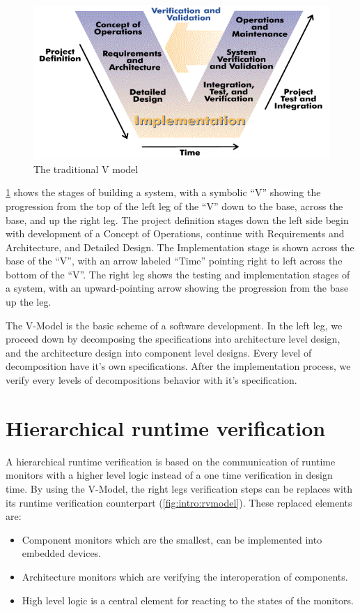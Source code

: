 \begin{figure}[h]
	\centering
	\includegraphics[width=0.8\linewidth]{include/figures/chapter_1/VModel}
	\caption{The traditional V model \cite{vmodel}}
	\label{fig:intro:vmodel}
\end{figure}

\cref{fig:intro:vmodel} shows the stages of building a system, with a symbolic “V” showing the progression from the top of the left leg of the ``V'' down to the base, across the base, and up the right leg. The project definition stages down the left side begin with development of a Concept of Operations, continue with Requirements and Architecture, and Detailed Design. The Implementation stage is shown across the base of the ``V'', with an arrow labeled ``Time'' pointing right to left across the bottom of the ``V''. The right leg shows the testing and implementation stages of a system, with an upward-pointing arrow showing the progression from the base up the leg. \cite{vmodel}

The V-Model is the basic scheme of a software development. In the left leg, we proceed down by decomposing the specifications into architecture level design, and the architecture design into component level designs. Every level of decomposition have it's own specifications. After the implementation process, we verify every levels of decompositions behavior with it's specification.

\section{Hierarchical runtime verification}

A hierarchical runtime verification is based on the communication of runtime monitors with a higher level logic instead of a one time verification in design time. By using the V-Model, the right legs verification steps can be replaces with its runtime verification counterpart (\cref{fig:intro:rvmodel}).
These replaced elements are:
\begin{itemize}
	\item Component monitors which are the smallest, can be implemented into embedded devices.
	\item Architecture monitors which are verifying the interoperation of components.
	\item High level logic is a central element for reacting to the states of the monitors.
\end{itemize}

